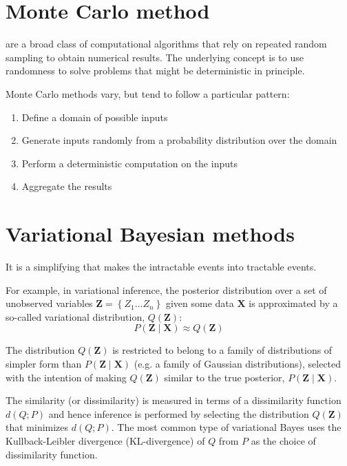 \section{Monte Carlo method}
\label{sec:monte-carlo-method}

 are a broad class of computational algorithms that rely on repeated random sampling to obtain numerical results.
The underlying concept is to use randomness to solve problems that might be deterministic in principle.


Monte Carlo methods vary, but tend to follow a particular pattern:
\begin{enumerate}
\item Define a domain of possible inputs
\item Generate inputs randomly from a probability distribution over the domain
\item Perform a deterministic computation on the inputs
\item Aggregate the results
\end{enumerate}



\section{Variational Bayesian methods}
\label{sec:vari-bayes-meth}


It is a simplifying that makes the intractable events into tractable events.

For example,
in variational inference, the posterior distribution over a set of unobserved variables $\mathbf{Z}=\left\{Z_1 \ldots Z_n\right\}$ given some data $\mathbf{X}$ is approximated by a so-called variational distribution, $Q(\mathbf{Z})$:
\begin{equation}
  \label{eq:26}
  P(\mathbf{Z} \mid \mathbf{X}) \approx Q(\mathbf{Z})  
\end{equation}


The distribution $Q(\mathbf{Z})$ is restricted to belong to a family of distributions of simpler form than $P(\mathbf{Z} \mid \mathbf{X})$ (e.g. a family of Gaussian distributions), selected with the intention of making $Q(\mathbf{Z})$ similar to the true posterior, $P(\mathbf{Z} \mid \mathbf{X})$.

The similarity (or dissimilarity) is measured in terms of a dissimilarity function $d(Q ; P)$ and hence inference is performed by selecting the distribution $Q(\mathbf{Z})$ that minimizes $d(Q ; P)$.
The most common type of variational Bayes uses the Kullback-Leibler divergence (KL-divergence) of $Q$ from $P$ as the choice of dissimilarity function. 

